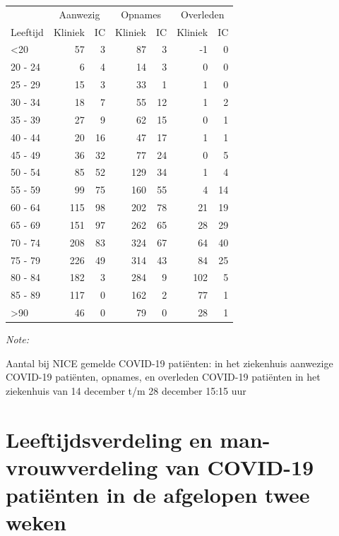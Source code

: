 \documentclass[
  english,
  man,floatsintext]{apa6}
\begin{document}
\begin{table}
\centering\begingroup\fontsize{10}{12}\selectfont

\begin{threeparttable}
\begin{tabular}{lrrrrrr}
\toprule
\multicolumn{1}{c}{ } & \multicolumn{2}{c}{Aanwezig} & \multicolumn{2}{c}{Opnames} & \multicolumn{2}{c}{Overleden} \\
\cmidrule(l{3pt}r{3pt}){2-3} \cmidrule(l{3pt}r{3pt}){4-5} \cmidrule(l{3pt}r{3pt}){6-7}
Leeftijd & Kliniek & IC & Kliniek & IC & Kliniek & IC\\
\midrule
<20 & 57 & 3 & 87 & 3 & -1 & 0\\
20 - 24 & 6 & 4 & 14 & 3 & 0 & 0\\
25 - 29 & 15 & 3 & 33 & 1 & 1 & 0\\
30 - 34 & 18 & 7 & 55 & 12 & 1 & 2\\
35 - 39 & 27 & 9 & 62 & 15 & 0 & 1\\
40 - 44 & 20 & 16 & 47 & 17 & 1 & 1\\
45 - 49 & 36 & 32 & 77 & 24 & 0 & 5\\
50 - 54 & 85 & 52 & 129 & 34 & 1 & 4\\
55 - 59 & 99 & 75 & 160 & 55 & 4 & 14\\
60 - 64 & 115 & 98 & 202 & 78 & 21 & 19\\
65 - 69 & 151 & 97 & 262 & 65 & 28 & 29\\
70 - 74 & 208 & 83 & 324 & 67 & 64 & 40\\
75 - 79 & 226 & 49 & 314 & 43 & 84 & 25\\
80 - 84 & 182 & 3 & 284 & 9 & 102 & 5\\
85 - 89 & 117 & 0 & 162 & 2 & 77 & 1\\
>90 & 46 & 0 & 79 & 0 & 28 & 1\\
\bottomrule
\end{tabular}
\begin{tablenotes}
\item \textit{Note: } 
\item Aantal bij NICE gemelde COVID-19 patiënten: in het ziekenhuis aanwezige COVID-19 patiënten, opnames, en overleden COVID-19 patiënten in het ziekenhuis van 14 december t/m 28 december 15:15 uur
\end{tablenotes}
\end{threeparttable}
\endgroup{}
\end{table}

\newpage

\hypertarget{leeftijdsverdeling-en-man-vrouwverdeling-van-covid-19-patiuxebnten-in-de-afgelopen-twee-weken}{%
\section{Leeftijdsverdeling en man-vrouwverdeling van COVID-19 patiënten in de afgelopen twee weken}\label{leeftijdsverdeling-en-man-vrouwverdeling-van-covid-19-patiuxebnten-in-de-afgelopen-twee-weken}}
\end{document}
